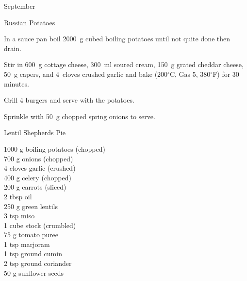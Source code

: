 \begin{menu}{September}
\begin{recipe}{2}{Russian Potatoes}
\begin{ingredients}
		\end{ingredients}
	
	
    \begin{instructions}
    \item 
        In a sauce pan boil
        2000~g cubed boiling potatoes
        until not quite done
        then drain.
      \item 
        Stir in
        600~g  cottage cheese,
        300~ml  soured cream,
        150~g grated cheddar cheese,
        50~g  capers,
        and
        4~cloves crushed garlic
        and bake (200$^{\circ}$C, Gas 5, 380$^{\circ}$F) for 30 minutes.
      \item 
        Grill 4  burgers and serve with the potatoes.
      \item 
        Sprinkle with
        50~g chopped spring onions
        to serve.
      
    \end{instructions}
    \end{recipe}%
  
    \begin{recipe}{2}{Lentil Shepherds Pie}%
		\begin{ingredients}
		1000 g boiling potatoes (chopped) \\
	700 g onions (chopped) \\
	4 cloves garlic (crushed) \\
	400 g celery (chopped) \\
	200 g carrots (sliced) \\
	2 tbsp oil  \\
	250 g green lentils  \\
	3 tsp miso  \\
	1 cube stock (crumbled) \\
	75 g tomato puree  \\
	1 tsp marjoram  \\
	1 tsp ground cumin  \\
	2 tsp ground coriander  \\
	50 g sunflower seeds  \\
	
		\end{ingredients}
	
	
	

\end{recipe}
\end{menu}
